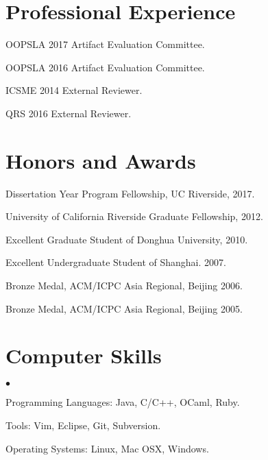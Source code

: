 \documentclass[margin,line]{res}
\newenvironment{list2}{
  \begin{list}{$\bullet$}{%
      \setlength{\itemsep}{0in}
      \setlength{\parsep}{0in} \setlength{\parskip}{0in}
      \setlength{\topsep}{0in} \setlength{\partopsep}{0in} 
      \setlength{\leftmargin}{0.2in}}}{\end{list}}
\begin{document}
\begin{resume}


\section{\sc Professional Experience}

OOPSLA 2017 Artifact Evaluation Committee.

\vspace*{-2.5mm}
OOPSLA 2016 Artifact Evaluation Committee.

\vspace*{-2.5mm}
ICSME 2014 External Reviewer.

\vspace*{-2.5mm}
QRS 2016 External Reviewer.


\section{\sc Honors and Awards} 
Dissertation Year Program Fellowship, UC Riverside, 2017.

\vspace*{-2.5mm}
University of California Riverside Graduate Fellowship, 2012.

\vspace*{-2.5mm}
Excellent Graduate Student of Donghua University, 2010.

\vspace*{-2.5mm}
Excellent Undergraduate Student of Shanghai. 2007.

\vspace*{-2.5mm}
Bronze Medal, ACM/ICPC Asia Regional, Beijing 2006.

\vspace*{-2.5mm}
Bronze Medal, ACM/ICPC Asia Regional, Beijing 2005.



\section{\sc Computer Skills} 
\begin{list2}
\item Programming Languages: Java, C/C++, OCaml, Ruby.
\item Tools: Vim, Eclipse, Git, Subversion.
\item Operating Systems: Linux, Mac OSX, Windows.
\end{list2}



\end{resume}
\end{document}
